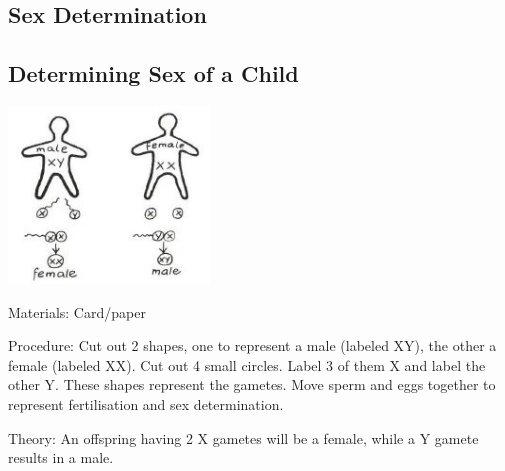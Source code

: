 \begin{multicols}{2}
\section*{Sex Determination}


\subsection{Determining Sex of a Child}

\begin{center}
\includegraphics[width=0.4\textwidth]{./img/vso/sex-determination.jpg}
\end{center}

\begin{description*}
\item[Materials:]{Card/paper}
\item[Procedure:]{Cut out 2 shapes, one to
represent a male (labeled XY), the
other a female (labeled XX). Cut
out 4 small circles. Label 3 of
them X and label the other Y.
These shapes represent the
gametes. Move sperm and eggs
together to represent fertilisation
and sex determination.}
\item[Theory:]{An offspring having 2 X gametes will be a female, while a Y gamete results in a male.}
\end{description*}



\end{multicols}
